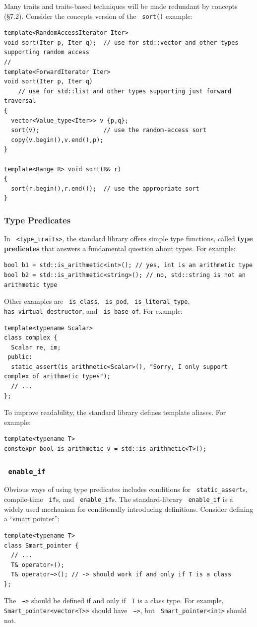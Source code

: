 \documentclass[11pt]{article}
\let\OldTexttt\texttt
\renewcommand{\texttt}[1]{\OldTexttt{\color{MidnightBlue} #1}}
\begin{document}
Many traits and traits-based techniques will be made redundant by concepts (§7.2). Consider the
concepts version of the \texttt{sort()} example:
\begin{verbatim}
template<RandomAccessIterator Iter>
void sort(Iter p, Iter q);  // use for std::vector and other types supporting random access
// 
template<ForwardIterator Iter>
void sort(Iter p, Iter q)
    // use for std::list and other types supporting just forward traversal
{
  vector<Value_type<Iter>> v {p,q};
  sort(v);                  // use the random-access sort
  copy(v.begin(),v.end(),p);
}

template<Range R> void sort(R& r)
{ 
  sort(r.begin(),r.end());  // use the appropriate sort
}
\end{verbatim}
\subsubsection{Type Predicates}
\label{sec:org3c6e62f}
In \texttt{<type\_traits>}, the standard library offers simple type functions, called \textbf{type predicates} that
answers a fundamental question about types. For example:
\begin{verbatim}
bool b1 = std::is_arithmetic<int>(); // yes, int is an arithmetic type
bool b2 = std::is_arithmetic<string>(); // no, std::string is not an arithmetic type
\end{verbatim}
Other examples are \texttt{is\_class}, \texttt{is\_pod}, \texttt{is\_literal\_type}, \texttt{has\_virtual\_destructor}, and \texttt{is\_base\_of}.
For example:
\begin{verbatim}
template<typename Scalar>
class complex {
  Scalar re, im;
 public:
  static_assert(is_arithmetic<Scalar>(), "Sorry, I only support complex of arithmetic types");
  // ...
};
\end{verbatim}

To improve readability, the standard library defines template aliases. For example:

\begin{verbatim}
template<typename T>
constexpr bool is_arithmetic_v = std::is_arithmetic<T>();
\end{verbatim}
\subsubsection{\texttt{enable\_if}}
\label{sec:org91d3ac0}
Obvious ways of using type predicates includes conditions for \texttt{static\_assert}s,
compile-time \texttt{if}s,
and \texttt{enable\_if}s. The standard-library \texttt{enable\_if} is a widely used mechanism for conditonally
introducing definitions. Consider defining a ``smart pointer'':
\begin{verbatim}
template<typename T>
class Smart_pointer {
  // ...
  T& operator∗();
  T& operator−>(); // -> should work if and only if T is a class
};
\end{verbatim}
The \texttt{−>} should be defined if and only if \texttt{T} is a class type. For example, \texttt{Smart\_pointer<vector<T>>}
should have \texttt{−>}, but \texttt{Smart\_pointer<int>} should not.
\end{document}
